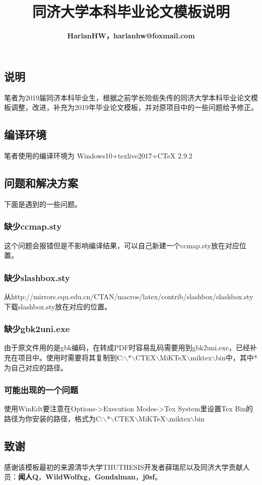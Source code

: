 \documentclass[UTF8]{ctexart}
\begin{document}
\title{同济大学本科毕业论文模板说明}
\author{\textbf{HarlanHW，harlanhw@foxmail.com}}
\maketitle
\subsection{说明}笔者为2019届同济本科毕业生，根据之前学长险些失传的同济大学本科毕业论文模板调整，改进，补充为2019年毕业论文模板，并对原项目中的一些问题给予修正。
\subsection{编译环境}
笔者使用的编译环境为 Windows10+texlive2017+CTeX 2.9.2
\subsection{问题和解决方案}
下面是遇到的一些问题。
\subsubsection{缺少ccmap.sty}
这个问题会报错但是不影响编译结果，可以自己新建一个ccmap.sty放在对应位置。
\subsubsection{缺少slashbox.sty}
从http://mirrors.cqu.edu.cn/CTAN/macros/latex/contrib/slashbox/slashbox.sty下载slashbox.sty放在对应的位置。
\subsubsection{缺少gbk2uni.exe}
由于原文件用的是gbk编码，在转成PDF时容易乱码需要用到gbk2uni.exe，已经补充在项目中。使用时需要将其复制到C:$\backslash$*$\backslash$CTEX$\backslash$MiKTeX$\backslash$miktex$\backslash$bin中，其中*为自己对应的路径。
\subsubsection{可能出现的一个问题}
使用WinEdt要注意在Options->Execution Modes->Tex System里设置Tex Bin的路径为你安装的路径，格式为C:$\backslash$*$\backslash$CTEX$\backslash$MiKTeX$\backslash$miktex$\backslash$bin
\subsection{致谢}
感谢该模板最初的来源清华大学T\small{HU}T\small{HESIS}开发者薛瑞尼以及同济大学贡献人员：\textbf{闻人Q}，\textbf{WildWolfxg}，\textbf{Gondalman}，\textbf{j0sf}。
\end{document}
